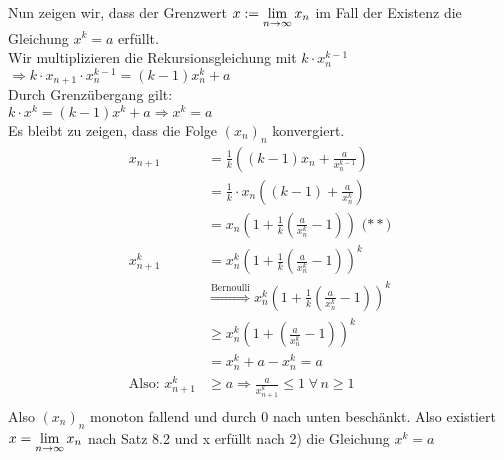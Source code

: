\documentclass[../ana1u.tex]{subfiles}
\begin{document}
\begin{bsp}
\begin{bew}
        Nun zeigen wir, dass der Grenzwert \(x := \lim\limits_{n\rightarrow\infty} x_n\) im Fall der Existenz die Gleichung \(x^k = a\) erfüllt.\\
        Wir multiplizieren die Rekursionsgleichung mit \(k \cdot x_n^{k-1}\)\\
        \(\Rightarrow k \cdot x_{n+1} \cdot x_n^{k-1} = (k-1)x_n^k + a\)\\
        Durch Grenzübergang gilt:\\
        \(k \cdot x^k = (k-1)x^k + a \Rightarrow x^k = a \)\\
        Es bleibt zu zeigen, dass die Folge \((x_n)_n\) konvergiert.
        \begin{align*}
            x_{n+1} &= \frac{1}{k}\left((k-1)x_n + \frac{a}{x_n^{k-1}}\right)\\
            &= \frac{1}{k} \cdot x_n \left((k-1) + \frac{a}{x_n^{k}}\right)\\
            &= x_n \left(1 + \frac{1}{k}\left(\frac{a}{x_n^k} - 1\right)\right) \text{ (\(\ast \ast\))}\\
            x_{n+1}^k &= x_n^k\left(1+\frac{1}{k}\left(\frac{a}{x_n^k} - 1 \right)\right)^k\\
            &\overset{\text{Bernoulli}}{\Rightarrow} x_n^k\left(1+\frac{1}{k}\left(\frac{a}{x_n^k} - 1 \right)\right)^k\\
            &\geq x_n^k\left(1+\left(\frac{a}{x_n^k} - 1 \right)\right)^k\\
            &= x_n^k + a - x_n^k = a\\
            \text{Also: } x_{n+1}^k &\geq a \Rightarrow \frac{a}{x_{n+1}^k} \leq 1 \; \forall \, n \geq 1\\
        \end{align*}
        Also \((x_n)_n\) monoton fallend und durch 0 nach unten beschänkt. Also existiert \(x = \lim\limits_{n\rightarrow\infty} x_n\) nach Satz 8.2 und x erfüllt nach 2) die Gleichung \(x^k = a\)
    \end{bew}
\end{bsp}
\end{document}
